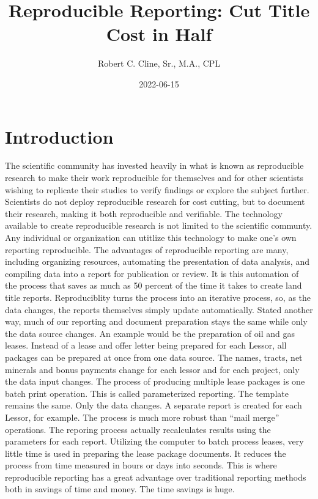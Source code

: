 \documentclass[
]{book}
\title{Reproducible Reporting: Cut Title Cost in Half}
\author{Robert C. Cline, Sr., M.A., CPL}
\date{2022-06-15}
\begin{document}
\maketitle

{
\setcounter{tocdepth}{1}
\tableofcontents
}
\hypertarget{introduction}{%
\chapter{Introduction}\label{introduction}}

The scientific community has invested heavily in what is known as reproducible research to make their work reproducible for themselves and for other scientists wishing to replicate their studies to verify findings or explore the subject further. Scientists do not deploy reproducible research for cost cutting, but to document their research, making it both reproducible and verifiable. The technology available to create reproducible research is not limited to the scientific communty. Any individual or organization can utitlize this technology to make one's own reporting reproducible. The advantages of reproducible reporting are many, including organizing resources, automating the presentation of data analysis, and compiling data into a report for publication or review. It is this automation of the process that saves as much as 50 percent of the time it takes to create land title reports. Reproduciblity turns the process into an iterative process, so, as the data changes, the reports themselves simply update automatically. Stated another way, much of our reporting and document preparation stays the same while only the data source changes. An example would be the preparation of oil and gas leases. Instead of a lease and offer letter being prepared for each Lessor, all packages can be prepared at once from one data source. The names, tracts, net minerals and bonus payments change for each lessor and for each project, only the data input changes. The process of producing multiple lease packages is one batch print operation. This is called parameterized reporting. The template remains the same. Only the data changes. A separate report is created for each Lessor, for example. The process is much more robust than ``mail merge'' operations. The reporing process actually recalculates results using the parameters for each report. Utilizing the computer to batch process leases, very little time is used in preparing the lease package documents. It reduces the process from time measured in hours or days into seconds. This is where reproducible reporting has a great advantage over traditional reporting methods both in savings of time and money. The time savings is huge.
\end{document}
